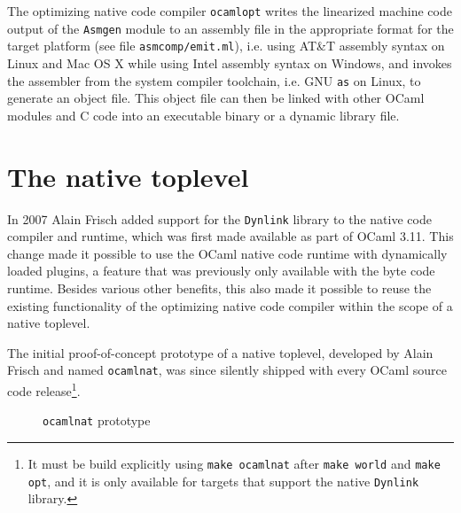 \documentclass[10pt,a4paper,final,twocolumn]{article}
\makeatletter
\newcommand{\ie}{i.e.\@\xspace}
\makeatother
\begin{document}
The optimizing native code compiler \texttt{ocamlopt} writes the linearized machine code output of the
\texttt{Asmgen} module to an assembly file in the appropriate format for the target platform (see file
\texttt{asmcomp/emit.ml}), \ie using AT\&T assembly syntax on Linux and Mac OS X while using Intel assembly
syntax on Windows, and invokes the assembler from the system compiler toolchain, \ie GNU \texttt{as} on Linux,
to generate an object file. This object file can then be linked with other OCaml modules and C code into
an executable binary or a dynamic library file.


\section{The native toplevel} \label{section:The_native_toplevel}

In 2007 Alain Frisch added support for the \texttt{Dynlink} library to the native code compiler and
runtime, which was first made available as part of OCaml 3.11. This change made it possible to use
the OCaml native code runtime with dynamically loaded plugins, a feature that was previously only
available with the byte code runtime. Besides various other benefits, this also made it possible
to reuse the existing functionality of the optimizing native code compiler within the scope of a
native toplevel.

The initial proof-of-concept prototype of a native toplevel, developed by Alain Frisch and named
\texttt{ocamlnat}, was since silently shipped with every OCaml source code release\footnote{It must
be build explicitly using \texttt{make ocamlnat} after \texttt{make world} and \texttt{make opt},
and it is only available for targets that support the native \texttt{Dynlink} library.}.

\begin{figure}[htb]
  \centering
  \caption{\texttt{ocamlnat} prototype}
  \label{fig:ocamlnat_prototype}
\end{figure}
\end{document}
